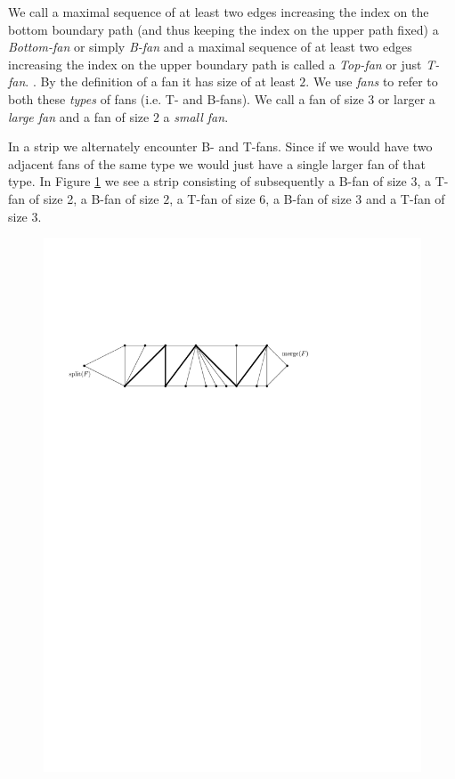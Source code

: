   We call a maximal sequence of at least two edges increasing the index on the bottom boundary path (and thus keeping the index on the upper path fixed) a \emph{Bottom-fan} or simply \emph{B-fan} and a maximal sequence of at least two edges increasing the index on the upper boundary path is called a \emph{Top-fan} or just \emph{T-fan}. . By the definition of a fan it has size of at least $2$.
  We use \emph{fans} to refer to both these \emph{types} of fans (i.e. T- and B-fans).
  We call a fan of size $3$ or larger a \emph{large fan} and a fan of size $2$ a \emph{small fan}.

  In a strip we alternately encounter B- and T-fans. Since if we would have two adjacent fans of the same type we would just have a single larger fan of that type.
  In Figure \ref{fig:uni:fans} we see a strip consisting of subsequently a B-fan of size $3$, a T-fan of size 2, a B-fan of size $2$, a T-fan of size $6$, a B-fan of size $3$ and a T-fan of size $3$.

  \begin{figure}[h]
    \centering
    \includegraphics[scale=.9]{rectangularDuals/img/fans}
    \caption{}
    \label{fig:uni:fans}
  \end{figure}



